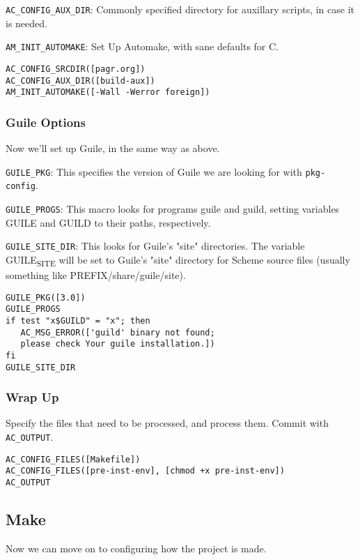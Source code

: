 \documentclass[11pt]{article}
\begin{document}
\texttt{AC\_CONFIG\_AUX\_DIR}: Commonly specified directory for auxillary scripts, in case
it is needed.

\texttt{AM\_INIT\_AUTOMAKE}: Set Up Automake, with sane defaults for C.

\begin{verbatim}
AC_CONFIG_SRCDIR([pagr.org])
AC_CONFIG_AUX_DIR([build-aux])
AM_INIT_AUTOMAKE([-Wall -Werror foreign])
\end{verbatim}

\subsubsection{Guile Options}
\label{sec:org6c86471}
Now we'll set up Guile, in the same way as above.

\texttt{GUILE\_PKG}: This specifies the version of Guile we are looking for with
\texttt{pkg-config}.

\texttt{GUILE\_PROGS}: This macro looks for programs guile and guild, setting variables
GUILE and GUILD to their paths, respectively.

\texttt{GUILE\_SITE\_DIR}: This looks for Guile’s "site" directories. The variable
GUILE\textsubscript{SITE} will be set to Guile’s "site" directory for Scheme source files
(usually something like PREFIX/share/guile/site).

\begin{verbatim}
GUILE_PKG([3.0])
GUILE_PROGS
if test "x$GUILD" = "x"; then
   AC_MSG_ERROR(['guild' binary not found;
   please check Your guile installation.])
fi
GUILE_SITE_DIR
\end{verbatim}

\subsubsection{Wrap Up}
\label{sec:org2bd2fe6}
Specify the files that need to be processed, and process them. Commit with
\texttt{AC\_OUTPUT}.

\begin{verbatim}
AC_CONFIG_FILES([Makefile])
AC_CONFIG_FILES([pre-inst-env], [chmod +x pre-inst-env])
AC_OUTPUT
\end{verbatim}

\subsection{Make}
\label{sec:org40e5684}
Now we can move on to configuring how the project is made.
\end{document}
